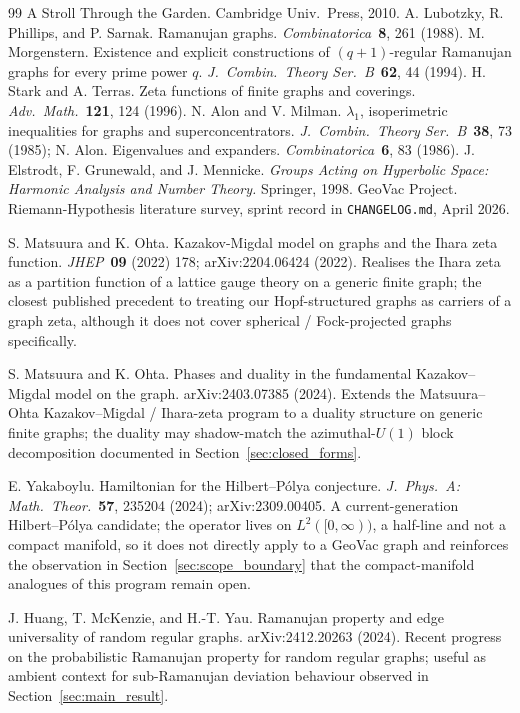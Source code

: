 \documentclass[11pt]{article}
\begin{document}
\begin{thebibliography}{99}
{A Stroll Through the Garden.}  Cambridge Univ.\ Press, 2010.
 A. Lubotzky, R. Phillips, and P. Sarnak.  Ramanujan
graphs.  \emph{Combinatorica}\ \textbf{8}, 261 (1988).
 M. Morgenstern.  Existence and explicit
constructions of $(q+1)$-regular Ramanujan graphs for every prime
power $q$.  \emph{J.\ Combin.\ Theory Ser.\ B}\ \textbf{62}, 44 (1994).
 H. Stark and A. Terras.  Zeta functions of finite
graphs and coverings.  \emph{Adv.\ Math.}\ \textbf{121}, 124 (1996).
 N. Alon and V. Milman.  $\lambda_1$, isoperimetric
inequalities for graphs and superconcentrators.  \emph{J.\ Combin.\
Theory Ser.\ B}\ \textbf{38}, 73 (1985); N. Alon.  Eigenvalues and
expanders.  \emph{Combinatorica}\ \textbf{6}, 83 (1986).
 J. Elstrodt, F. Grunewald, and J. Mennicke.
\emph{Groups Acting on Hyperbolic Space: Harmonic Analysis and Number
Theory.}  Springer, 1998.
 GeoVac Project.  Riemann-Hypothesis literature
survey, sprint record in \texttt{CHANGELOG.md}, April 2026.

 S. Matsuura and K. Ohta.  Kazakov-Migdal model
on graphs and the Ihara zeta function.  \emph{JHEP}\ \textbf{09}
(2022) 178;
arXiv:2204.06424 (2022).  Realises the Ihara zeta as a partition
function of a lattice gauge theory on a generic finite graph; the
closest published precedent to treating our Hopf-structured graphs
as carriers of a graph zeta, although it does not cover spherical /
Fock-projected graphs specifically.

 S. Matsuura and K. Ohta.  Phases
and duality in the fundamental Kazakov--Migdal model on the graph.
arXiv:2403.07385 (2024).  Extends the Matsuura--Ohta
Kazakov--Migdal / Ihara-zeta program to a duality structure on
generic finite graphs; the duality may shadow-match the
azimuthal-$U(1)$ block decomposition documented in
Section~\ref{sec:closed_forms}.

 E. Yakaboylu.  Hamiltonian for the
Hilbert--P\'olya conjecture.
\emph{J.\ Phys.\ A: Math.\ Theor.}\ \textbf{57}, 235204 (2024);
arXiv:2309.00405.  A current-generation Hilbert--P\'olya candidate;
the operator lives on $L^2([0,\infty))$, a half-line and not a
compact manifold, so it does not directly apply to a GeoVac graph
and reinforces the observation in Section~\ref{sec:scope_boundary}
that the compact-manifold analogues of this program remain open.

 J. Huang, T. McKenzie, and H.-T. Yau.  Ramanujan
property and edge universality of random regular graphs.
arXiv:2412.20263 (2024).  Recent progress on the probabilistic
Ramanujan property for random regular graphs; useful as ambient
context for sub-Ramanujan deviation behaviour observed in
Section~\ref{sec:main_result}.


\end{thebibliography}
\end{document}
